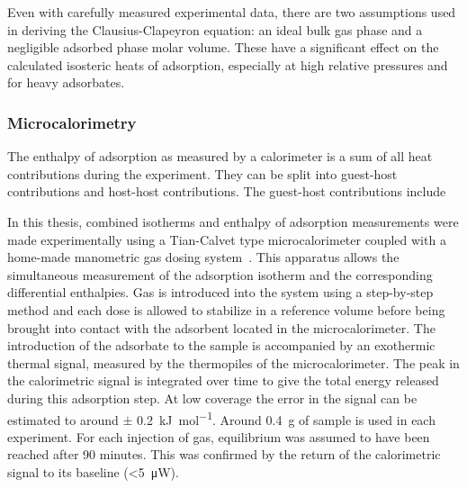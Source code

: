 Even with carefully measured experimental data, there are two 
assumptions used in deriving the Clausius-Clapeyron equation: 
an ideal bulk gas phase and a negligible adsorbed phase
molar volume. These have a significant effect on the calculated 
isosteric heats of adsorption, especially at high relative pressures 
and for heavy adsorbates.

\subsubsection{Microcalorimetry}


The enthalpy of adsorption as measured by a calorimeter is a 
sum of all heat contributions during the experiment. They can 
be split into guest-host contributions and host-host contributions.
The guest-host contributions include 

In this thesis, combined isotherms and enthalpy of adsorption
measurements were made experimentally using a Tian-Calvet type
microcalorimeter coupled with a home-made manometric gas dosing
system~\cite{llewellynGasAdsorptionMicrocalorimetry2005}. 
This apparatus allows the simultaneous measurement 
of the adsorption isotherm and the corresponding differential 
enthalpies. Gas is introduced into the system using a step-by-step
method and each dose is allowed to stabilize in a
reference volume before being brought into contact with the
adsorbent located in the microcalorimeter. The introduction of the
adsorbate to the sample is accompanied by an exothermic thermal signal,
measured by the thermopiles of the microcalorimeter. The peak in the
calorimetric signal is integrated over time 
to give the total energy released during this adsorption step.
At low coverage the error in the signal can be estimated to around 
\( \pm \) \SI{0.2} {\kilo\joule\per\mol}. Around \SI{0.4}{\gram} of 
sample is used in each experiment. 
For each injection of gas, equilibrium was assumed to have
been reached after 90 minutes. This was confirmed by the return
of the calorimetric signal to its baseline (<\SI{5}{\micro\watt}).